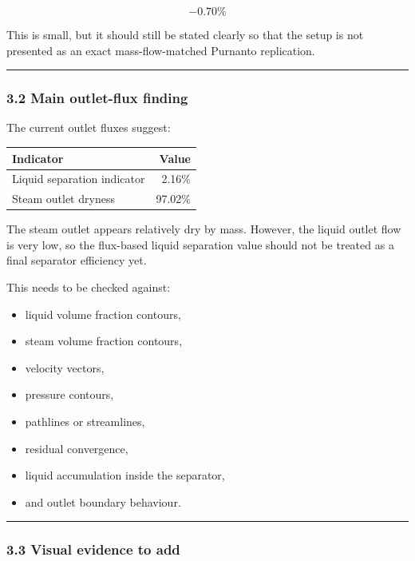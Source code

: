 \documentclass[
  11pt,
]{article}
\newcounter{none} %
\providecommand{\tightlist}{%
  \setlength{\itemsep}{0pt}\setlength{\parskip}{0pt}}
\begin{document}
\[
-0.70\%
\]

This is small, but it should still be stated clearly so that the setup
is not presented as an exact mass-flow-matched Purnanto replication.

\begin{center}\rule{0.5\linewidth}{0.5pt}\end{center}

\subsubsection{3.2 Main outlet-flux
finding}\label{main-outlet-flux-finding}

The current outlet fluxes suggest:

{\def\LTcaptype{none} %
\begin{longtable}[]{@{}lr@{}}
\toprule\noalign{}
Indicator & Value \\
\midrule\noalign{}
\endhead
\bottomrule\noalign{}
\endlastfoot
Liquid separation indicator & 2.16\% \\
Steam outlet dryness & 97.02\% \\
\end{longtable}
}

The steam outlet appears relatively dry by mass. However, the liquid
outlet flow is very low, so the flux-based liquid separation value
should not be treated as a final separator efficiency yet.

This needs to be checked against:

\begin{itemize}
\tightlist
\item
  liquid volume fraction contours,
\item
  steam volume fraction contours,
\item
  velocity vectors,
\item
  pressure contours,
\item
  pathlines or streamlines,
\item
  residual convergence,
\item
  liquid accumulation inside the separator,
\item
  and outlet boundary behaviour.
\end{itemize}

\begin{center}\rule{0.5\linewidth}{0.5pt}\end{center}

\subsubsection{3.3 Visual evidence to add}\label{visual-evidence-to-add}
\end{document}
